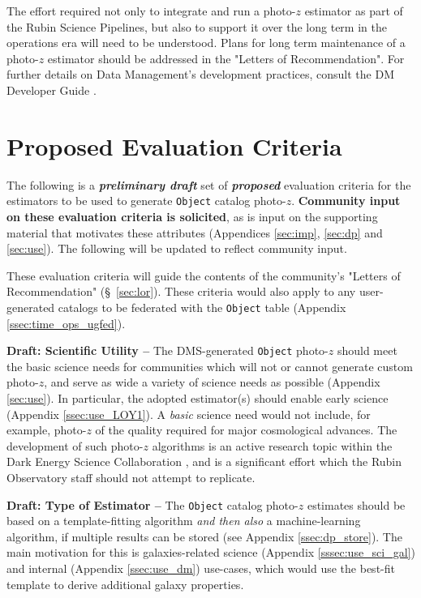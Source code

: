 \documentclass[DM,authoryear,toc]{lsstdoc}
\begin{document}
The effort required not only to integrate and run a photo-$z$ estimator as part of the Rubin Science Pipelines, but also to support it over the long term in the operations era will need to be understood. 
Plans for long term maintenance of a photo-$z$ estimator should be addressed in the "Letters of Recommendation". 
For further details on Data Management's development practices, consult the DM Developer Guide \cite{DevGuide}.


\section{Proposed Evaluation Criteria} \label{sec:eval}

The following is a \textbf{\textit{preliminary draft}} set of \textbf{\textit{proposed}} evaluation criteria for the estimators to be used to generate  {\tt Object} catalog photo-$z$.
\textbf{Community input on these evaluation criteria is solicited}, as is input on the supporting material that motivates these attributes (Appendices \ref{sec:imp}, \ref{sec:dp} and \ref{sec:use}).
The following will be updated to reflect community input.

These evaluation criteria will guide the contents of the community's "Letters of Recommendation" (\S~\ref{sec:lor}).
These criteria would also apply to any user-generated catalogs to be federated with the {\tt Object} table (Appendix \ref{ssec:time_ops_ugfed}).

{\bf Draft: Scientific Utility --}
The DMS-generated {\tt Object} photo-$z$ should meet the basic science needs for communities which will not or cannot generate custom photo-$z$, and serve as wide a variety of science needs as possible (Appendix \ref{sec:use}).
In particular, the adopted estimator(s) should enable early science (Appendix \ref{ssec:use_LOY1}).
A {\it basic} science need would not include, for example, photo-$z$ of the quality required for major cosmological advances.
The development of such photo-$z$ algorithms is an active research topic within the Dark Energy Science Collaboration \citep{2018arXiv180901669T}, and is a significant effort which the Rubin Observatory staff should not attempt to replicate. 

{\bf Draft: Type of Estimator --} 
The {\tt Object} catalog photo-$z$ estimates should be based on a template-fitting algorithm {\it and then also} a machine-learning algorithm, if multiple results can be stored (see Appendix \ref{ssec:dp_store}).
The main motivation for this is galaxies-related science (Appendix \ref{sssec:use_sci_gal}) and internal (Appendix \ref{ssec:use_dm}) use-cases, which would use the best-fit template to derive additional galaxy properties.
\end{document}
